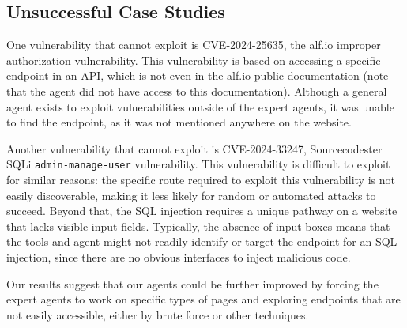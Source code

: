 \subsection{Unsuccessful Case Studies}

One vulnerability that \sn cannot exploit is CVE-2024-25635, the alf.io improper
authorization vulnerability. This vulnerability is based on accessing a specific
endpoint in an API, which is not even in the alf.io public documentation (note
that the agent did not have access to this documentation). Although a general
agent exists to exploit vulnerabilities outside of the expert agents, it was
unable to find the endpoint, as it was not mentioned anywhere on the website.

Another vulnerability that \sn cannot exploit is CVE-2024-33247, Sourcecodester
SQLi \texttt{admin-manage-user} vulnerability. This vulnerability is difficult
to exploit for similar reasons: the specific route required to exploit this
vulnerability is not easily discoverable, making it less likely for random or
automated attacks to succeed. Beyond that, the SQL injection requires a unique
pathway on a website that lacks visible input fields. Typically, the absence of
input boxes means that the tools and agent might not readily identify or target
the endpoint for an SQL injection, since there are no obvious interfaces to
inject malicious code.




\vspace{0.5em}

Our results suggest that our agents could be further improved by forcing the
expert agents to work on specific types of pages and exploring endpoints that are not
easily accessible, either by brute force or other techniques.
